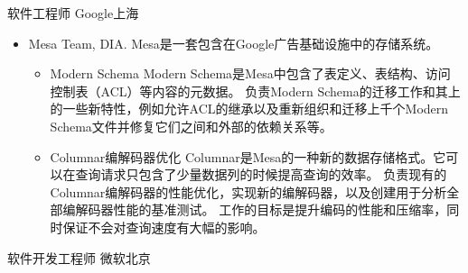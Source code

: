 \documentclass[10pt,a4paper,roman]{moderncv} %
\begin{document}
        {软件工程师}
        {}
        {Google上海}
        {}
        {\begin{itemize}%
         \item Mesa Team, DIA.
               Mesa\footnotemark[2]{}是一套包含在Google广告基础设施中的存储系统。
               \begin{itemize}%
               \item Modern Schema\newline{}%
                     Modern Schema是Mesa中包含了表定义、表结构、访问控制表（ACL）等内容的元数据。\newline{}%
                     负责Modern Schema的迁移工作和其上的一些新特性，例如允许ACL的继承以及重新组织和迁移上千个Modern Schema文件并修复它们之间和外部的依赖关系等。
               \item Columnar编解码器优化\newline{}%
                     Columnar是Mesa的一种新的数据存储格式。它可以在查询请求只包含了少量数据列的时候提高查询的效率。\newline{}%
                     负责现有的Columnar编解码器的性能优化，实现新的编解码器，以及创建用于分析全部编解码器性能的基准测试。\newline{}%
                     工作的目标是提升编码的性能和压缩率，同时保证不会对查询速度有大幅的影响。
               \end{itemize}
         \end{itemize}}
        {软件开发工程师}
        {}
        {微软北京}
        {}
\end{document}
